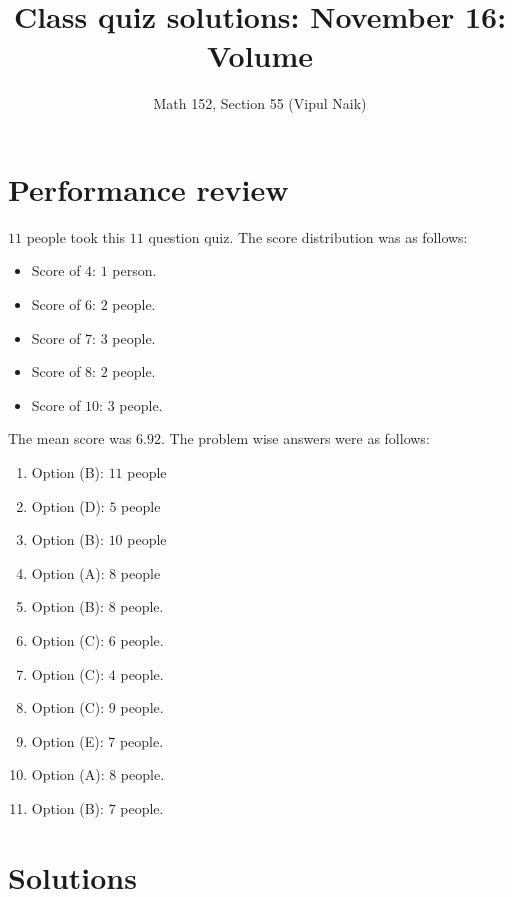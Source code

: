 \documentclass[10pt]{amsart}
\title{Class quiz solutions: November 16: Volume}
\author{Math 152, Section 55 (Vipul Naik)}
\begin{document}
\maketitle

\section{Performance review}

$11$ people took this $11$ question quiz. The score distribution was
as follows:

\begin{itemize}
\item Score of $4$: $1$ person.
\item Score of $6$: $2$ people.
\item Score of $7$: $3$ people.
\item Score of $8$: $2$ people.
\item Score of $10$: $3$ people.
\end{itemize}

The mean score was $6.92$. The problem wise answers were as follows:

\begin{enumerate}
\item Option (B): $11$ people
\item Option (D): $5$ people
\item Option (B): $10$ people
\item Option (A): $8$ people
\item Option (B): $8$ people.
\item Option (C): $6$ people.
\item Option (C): $4$ people.
\item Option (C): $9$ people.
\item Option (E): $7$ people.
\item Option (A): $8$ people.
\item Option (B): $7$ people.
\end{enumerate}

\section{Solutions}
\end{document}
